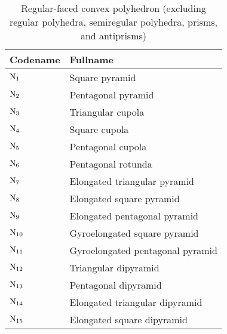 \begin{table}[htbp]
\caption{Regular-faced convex polyhedron (excluding regular polyhedra,
semiregular polyhedra, prisms, and antiprisms)}
\label{table:others}
\begin{center}
\begin{tabular}{l|l} \hline
Codename & Fullname \\ \hline
$\mbox{N$_{1}$}$ & Square pyramid \\
$\mbox{N$_{2}$}$ & Pentagonal pyramid \\
$\mbox{N$_{3}$}$ & Triangular cupola \\
$\mbox{N$_{4}$}$ & Square cupola \\
$\mbox{N$_{5}$}$ & Pentagonal cupola \\
$\mbox{N$_{6}$}$ & Pentagonal rotunda \\
$\mbox{N$_{7}$}$ & Elongated triangular pyramid \\
$\mbox{N$_{8}$}$ & Elongated square pyramid \\
$\mbox{N$_{9}$}$ & Elongated pentagonal pyramid \\
$\mbox{N$_{10}$}$ & Gyro\-elongated square pyramid \\
$\mbox{N$_{11}$}$ & Gyro\-elongated pentagonal pyramid \\
$\mbox{N$_{12}$}$ & Triangular dipyramid \\
$\mbox{N$_{13}$}$ & Pentagonal dipyramid \\
$\mbox{N$_{14}$}$ & Elongated triangular dipyramid \\
$\mbox{N$_{15}$}$ & Elongated square dipyramid \\
\hline
\end{tabular}
\end{center}
\end{table}

\newpage

